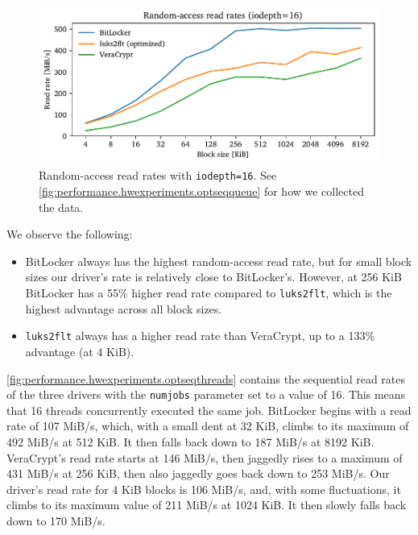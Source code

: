 \begin{figure}[htb!]
	\center
	\includegraphics[scale=1]{../fig/performance.hwexperiments.optrandqueue.pdf}
	\caption[
		Random-access read rates with \texttt{iodepth=16}
	]{
		Random-access read rates with \texttt{iodepth=16}. See \autoref{fig:performance.hwexperiments.optseqqueue} for how we collected the data.
	}
	\label{fig:performance.hwexperiments.optrandqueue}
\end{figure}

We observe the following:
\begin{itemize}
	\item BitLocker always has the highest random-access read rate, but for small block sizes our driver's rate is relatively close to BitLocker's. However, at 256 KiB BitLocker has a 55\% higher read rate compared to \texttt{luks2flt}, which is the highest advantage across all block sizes.
	\item \texttt{luks2flt} always has a higher read rate than VeraCrypt, up to a 133\% advantage (at 4 KiB).
\end{itemize}

\autoref{fig:performance.hwexperiments.optseqthreads} contains the sequential read rates of the three drivers with the \texttt{numjobs} parameter set to a value of 16. This means that 16 threads concurrently executed the same job. BitLocker begins with a read rate of 107 MiB/s, which, with a small dent at 32 KiB, climbs to its maximum of 492 MiB/s at 512 KiB. It then falls back down to 187 MiB/s at 8192 KiB. VeraCrypt's read rate starts at 146 MiB/s, then jaggedly rises to a maximum of 431 MiB/s at 256 KiB, then also jaggedly goes back down to 253 MiB/s. Our driver's read rate for 4 KiB blocks is 106 MiB/s, and, with some fluctuations, it climbs to its maximum value of 211 MiB/s at 1024 KiB. It then slowly falls back down to 170 MiB/s.

